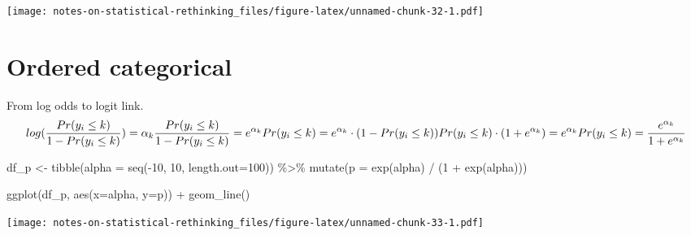 \documentclass[
]{book}
\newenvironment{Shaded}{\begin{snugshade}}{\end{snugshade}}
\newcommand{\AttributeTok}[1]{\textcolor[rgb]{0.77,0.63,0.00}{#1}}
\newcommand{\DecValTok}[1]{\textcolor[rgb]{0.00,0.00,0.81}{#1}}
\newcommand{\FunctionTok}[1]{\textcolor[rgb]{0.00,0.00,0.00}{#1}}
\newcommand{\NormalTok}[1]{#1}
\newcommand{\OtherTok}[1]{\textcolor[rgb]{0.56,0.35,0.01}{#1}}
\newcommand{\SpecialCharTok}[1]{\textcolor[rgb]{0.00,0.00,0.00}{#1}}
\begin{document}
\texttt{[image: notes-on-statistical-rethinking\_files/figure-latex/unnamed-chunk-32-1.pdf]}

\hypertarget{ordered-categorical}{%
\section{Ordered categorical}\label{ordered-categorical}}

From log odds to logit link.
\[
log(\frac{Pr(y_i \leq k)}{1 - Pr(y_i \leq k)}) = \alpha_k \\
\frac{Pr(y_i \leq k)}{1 - Pr(y_i \leq k)} = e^{\alpha_k} \\
Pr(y_i \leq k) = e^{\alpha_k} \cdot ( 1 - Pr(y_i \leq k)) \\
Pr(y_i \leq k) \cdot ( 1 + e^{\alpha_k}) = e^{\alpha_k} \\
Pr(y_i \leq k) = \frac{e^{\alpha_k}}{1 + e^{\alpha_k}}
\]

\begin{Shaded}
\begin{Highlighting}[]
\NormalTok{df\_p }\OtherTok{\textless{}{-}}
  \FunctionTok{tibble}\NormalTok{(}\AttributeTok{alpha =} \FunctionTok{seq}\NormalTok{(}\SpecialCharTok{{-}}\DecValTok{10}\NormalTok{, }\DecValTok{10}\NormalTok{, }\AttributeTok{length.out=}\DecValTok{100}\NormalTok{)) }\SpecialCharTok{\%\textgreater{}\%}
  \FunctionTok{mutate}\NormalTok{(}\AttributeTok{p =} \FunctionTok{exp}\NormalTok{(alpha) }\SpecialCharTok{/}\NormalTok{ (}\DecValTok{1} \SpecialCharTok{+} \FunctionTok{exp}\NormalTok{(alpha)))}

\FunctionTok{ggplot}\NormalTok{(df\_p, }\FunctionTok{aes}\NormalTok{(}\AttributeTok{x=}\NormalTok{alpha, }\AttributeTok{y=}\NormalTok{p)) }\SpecialCharTok{+} 
  \FunctionTok{geom\_line}\NormalTok{()}
\end{Highlighting}
\end{Shaded}

\texttt{[image: notes-on-statistical-rethinking\_files/figure-latex/unnamed-chunk-33-1.pdf]}
\end{document}
